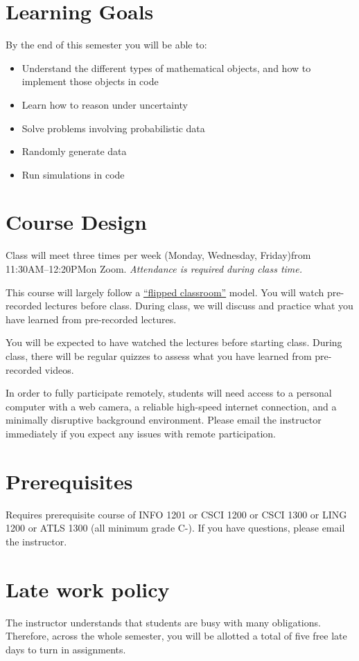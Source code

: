 \documentclass[10pt]{memoir}
\def\mymeetingdays{Monday, Wednesday, Friday}
\def\mymeetingtimes{11:30AM--12:20PM}
\begin{document}
\section{Learning Goals}

By the end of this semester you will be able to:
\begin{itemize}
\item Understand the different types of mathematical objects, and how to implement those objects in code
\item Learn how to reason under uncertainty
\item Solve problems involving probabilistic data
\item Randomly generate data 
\item Run simulations in code
\end{itemize}

\section{Course Design}
Class will meet three times per week (\mymeetingdays)\space from \mymeetingtimes\space on Zoom. \textit{Attendance is required during class time.} 

This course will largely follow a \href{https://en.wikipedia.org/wiki/Flipped_classroom}{``flipped classroom''}  model. You will watch pre-recorded lectures before class. During class, we will discuss and practice what you have learned from pre-recorded lectures. 

You will be expected to have watched the lectures before starting class. During class, there will be regular quizzes to assess what you have learned from pre-recorded videos. 

In order to fully participate remotely, students will need access to a personal computer with a web camera, a reliable high-speed internet connection, and a minimally disruptive background environment. Please email the instructor immediately if you expect any issues with remote participation.

\section{Prerequisites}

Requires prerequisite course of INFO 1201 or CSCI 1200 or CSCI 1300 or LING 1200 or ATLS 1300 (all minimum grade C-). If you have questions, please email the instructor.

\section{Late work policy}
The instructor understands that students are busy with many obligations. Therefore, across the whole semester, you will be allotted a total of five free late days to turn in assignments. 
\end{document}
